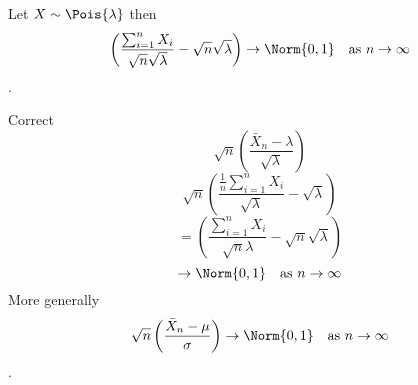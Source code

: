 \documentclass[tf-tutorial-all.tex]{subfiles}
\begin{document}
\begin{truefalse}
Let $X \sim \Pois{\lambda}$ then $$\left( \frac{ \sum^{n}_{i=1} X_{i}}{\sqrt{n} \sqrt{\lambda}} - \sqrt{n}\sqrt{\lambda} \right) \to \Norm{0,1} \quad \text{as } n \to \infty$$.
\begin{solution}
Correct\\
$$\sqrt{n} \left( \frac{ \bar{X}_{n}  - \lambda}{\sqrt{\lambda}}  \right) $$ 
$$\sqrt{n} \left( \frac{ \frac{1}{n} \sum^{n}_{i=1} X_{i}  }{\sqrt{\lambda}} - \sqrt{\lambda}  \right) $$ 
$$ = \left( \frac{ \sum^{n}_{i=1} X_{i}}{\sqrt{n}\lambda} - \sqrt{n}\sqrt{\lambda} \right)$$
$$
\to \Norm{0,1} \quad \text{as } n \to \infty$$
More generally
$$ \sqrt{n}\left(\frac{\bar{X}_{n} - \mu}{\sigma}  \right) \to \Norm{0,1} \quad \text{as } n \to \infty$$.
\end{solution}
\end{truefalse}
\end{document}

